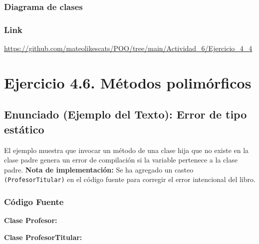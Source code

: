 \documentclass[a4paper]{article} %
\newcommand{\umlclass}[7]{%
  \node[inner sep=0pt, outer sep=0pt, drop shadow={opacity=0.25, shadow xshift=2pt, shadow yshift=-2pt}] (#1) at #2 {%
    \scriptsize\sffamily
    \renewcommand{\arraystretch}{1.10}%
    \setlength{\tabcolsep}{4pt}%
    \begin{tabular}{|L{#3}|}
      \hline
      \rowcolor{#4}\multicolumn{1}{|c|}{\bfseries #5}\\
      \hline
      #6\\
      \hline
      #7\\
      \hline
    \end{tabular}%
  };%
}
\begin{document}
\subsubsection{Diagrama de clases}
\begin{center}
\end{center}

\subsubsection{Link}
\url{https://github.com/mateolikescats/POO/tree/main/Actividad_6/Ejercicio_4_4}


\newpage
\section{Ejercicio 4.6. Métodos polimórficos}

\subsection{Enunciado (Ejemplo del Texto): Error de tipo estático}
El ejemplo muestra que invocar un método de una clase hija que no existe en la clase padre genera un error de compilación si la variable pertenece a la clase padre. \textbf{Nota de implementación:} Se ha agregado un casteo \texttt{(ProfesorTitular)} en el código fuente para corregir el error intencional del libro.

\subsubsection{Código Fuente}
\textbf{Clase Profesor:}


\textbf{Clase ProfesorTitular:}

\end{document}
